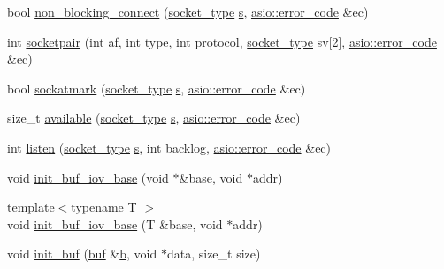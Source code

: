 \begin{DoxyCompactItemize}
bool \hyperlink{namespaceasio_1_1detail_1_1socket__ops_aa06be8dd632b2e6d43727496bcbc614c}{non\+\_\+blocking\+\_\+connect} (\hyperlink{namespaceasio_1_1detail_a6798c771dd84b79798b1a08150706ea9}{socket\+\_\+type} \hyperlink{group__async__connect_ga31ab74b9ea6c77932dddd016cfc7920a}{s}, \hyperlink{classasio_1_1error__code}{asio\+::error\+\_\+code} \&ec)
\item 
int \hyperlink{namespaceasio_1_1detail_1_1socket__ops_ada55da61beef75c5958f33c784f6a3c6}{socketpair} (int af, int type, int protocol, \hyperlink{namespaceasio_1_1detail_a6798c771dd84b79798b1a08150706ea9}{socket\+\_\+type} sv\mbox{[}2\mbox{]}, \hyperlink{classasio_1_1error__code}{asio\+::error\+\_\+code} \&ec)
\item 
bool \hyperlink{namespaceasio_1_1detail_1_1socket__ops_aa09513dd30439b9d31c2a2e1bbbb7f0c}{sockatmark} (\hyperlink{namespaceasio_1_1detail_a6798c771dd84b79798b1a08150706ea9}{socket\+\_\+type} \hyperlink{group__async__connect_ga31ab74b9ea6c77932dddd016cfc7920a}{s}, \hyperlink{classasio_1_1error__code}{asio\+::error\+\_\+code} \&ec)
\item 
size\+\_\+t \hyperlink{namespaceasio_1_1detail_1_1socket__ops_a6310acbfccf5ade0364c10c9f2d2b1ce}{available} (\hyperlink{namespaceasio_1_1detail_a6798c771dd84b79798b1a08150706ea9}{socket\+\_\+type} \hyperlink{group__async__connect_ga31ab74b9ea6c77932dddd016cfc7920a}{s}, \hyperlink{classasio_1_1error__code}{asio\+::error\+\_\+code} \&ec)
\item 
int \hyperlink{namespaceasio_1_1detail_1_1socket__ops_a2554586ea010408b02fdd2c98e074b13}{listen} (\hyperlink{namespaceasio_1_1detail_a6798c771dd84b79798b1a08150706ea9}{socket\+\_\+type} \hyperlink{group__async__connect_ga31ab74b9ea6c77932dddd016cfc7920a}{s}, int backlog, \hyperlink{classasio_1_1error__code}{asio\+::error\+\_\+code} \&ec)
\item 
void \hyperlink{namespaceasio_1_1detail_1_1socket__ops_a2d501279eddfe77032f0fdfd877dfab8}{init\+\_\+buf\+\_\+iov\+\_\+base} (void $\ast$\&base, void $\ast$addr)
\item 
{\footnotesize template$<$typename T $>$ }\\void \hyperlink{namespaceasio_1_1detail_1_1socket__ops_a5b51f60f168c89cc2e8c67f35437cdc2}{init\+\_\+buf\+\_\+iov\+\_\+base} (T \&base, void $\ast$addr)
\item 
void \hyperlink{namespaceasio_1_1detail_1_1socket__ops_abc10860fe625b4f72fffa1872d82f570}{init\+\_\+buf} (\hyperlink{namespaceasio_1_1detail_1_1socket__ops_aac19d854d021af5882325264a1833c65}{buf} \&\hyperlink{group__async__read_ga945a5c18fa77a9e2eba420f8f44b2a4f}{b}, void $\ast$data, size\+\_\+t size)

\end{DoxyCompactItemize}
